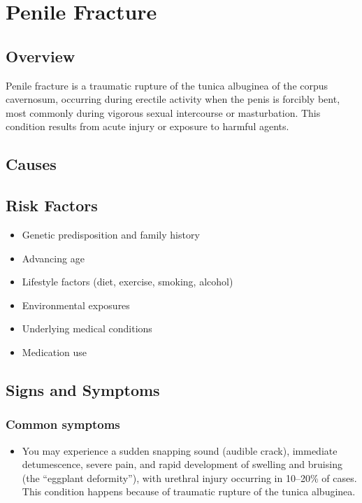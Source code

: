 \chapter{Penile Fracture}
\label{sec:Penile Fracture}

\section{Overview}
Penile fracture is a traumatic rupture of the tunica albuginea of the corpus cavernosum, occurring during erectile activity when the penis is forcibly bent, most commonly during vigorous sexual intercourse or masturbation. This condition results from acute injury or exposure to harmful agents.
\section{Causes}
\section{Risk Factors}

\begin{itemize}[noitemsep]
  \item Genetic predisposition and family history
  \item Advancing age
  \item Lifestyle factors (diet, exercise, smoking, alcohol)
  \item Environmental exposures
  \item Underlying medical conditions
  \item Medication use
\end{itemize}
\section{Signs and Symptoms}

\subsection{Common symptoms}
\begin{itemize}[noitemsep]
  \item You may experience a sudden snapping sound (audible crack), immediate detumescence, severe pain, and rapid development of swelling and bruising (the ``eggplant deformity''), with urethral injury occurring in 10--20\% of cases. This condition happens because of traumatic rupture of the tunica albuginea. 
  \end{itemize}

